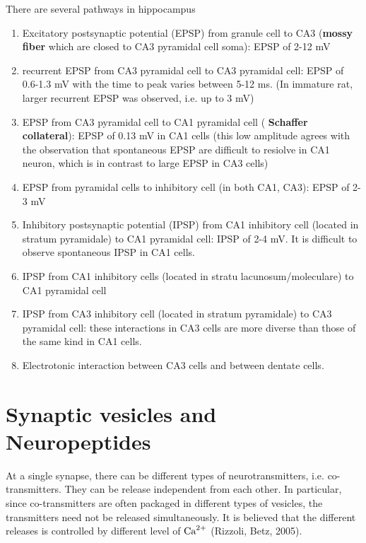 There are several pathways in hippocampus
\begin{enumerate}
\item Excitatory postsynaptic potential (EPSP) from granule cell to
  CA3 ({\bf mossy fiber} which are closed to CA3 pyramidal cell soma):
  EPSP of 2-12 mV

\item recurrent EPSP from CA3 pyramidal cell to CA3 pyramidal cell:
  EPSP of 0.6-1.3 mV with the time to peak varies between 5-12 ms. (In
  immature rat, larger recurrent EPSP was observed, i.e. up to 3 mV)

\item EPSP from CA3 pyramidal cell to CA1 pyramidal cell ({\bf
    Schaffer collateral}): EPSP of 0.13 mV in CA1 cells (this low
  amplitude agrees with the observation that spontaneous EPSP are
  difficult to resiolve in CA1 neuron, which is in contrast to large
  EPSP in CA3 cells)

\item EPSP from pyramidal cells to inhibitory cell (in both CA1, CA3):
  EPSP of 2-3 mV

\item Inhibitory postsynaptic potential (IPSP) from CA1 inhibitory
  cell (located in stratum pyramidale) to CA1 pyramidal cell: IPSP of 2-4 mV. It is difficult to
  observe spontaneous IPSP in CA1 cells.

\item IPSP from CA1 inhibitory cells (located in stratu
  lacunosum/moleculare) to CA1 pyramidal cell

\item IPSP from CA3 inhibitory cell (located in stratum pyramidale) to
  CA3 pyramidal cell: these interactions in CA3 cells are more diverse
  than those of the same kind in CA1 cells.

\item Electrotonic interaction between CA3 cells and between dentate cells.
\end{enumerate}


\section{Synaptic vesicles and Neuropeptides}
\label{sec:neurotransmitter-release}

At a single synapse, there can be different types of neurotransmitters, i.e.
co-transmitters. They can be release independent from each other.
In particular, since co-transmitters are often packaged in different types of
vesicles, the transmitters need not be released simultaneously. 
It is believed that the different releases is controlled by different level of
${\text{Ca}^{2+}}$ (Rizzoli, Betz, 2005).

